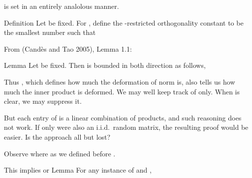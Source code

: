  is set in an entirely analolous manner.

\stopsubsection

\startsubsection [title={Suffice It to Ignore DFT Matrix}]

\Result
{Definition}
{
Let  be fixed.
For , define the -restricted orthogonality constant  to be the smallest number such that
}

From  (Cand\`es and Tao 2005), Lemma 1.1:

\Result
{Lemma}
{
Let  be fixed.
Then  is bounded in both direction as follows,
}

Thus , which defines how much the deformation of norm is, also tells us how much the inner product is deformed.
We may well keep track of  only.
When  is clear, we may suppress it.

But each entry of  is a linear combination of products, and such reasoning does not work.
If only  were also an i.i.d.\ random matrix, the resulting proof would be easier.
Is the approach all but lost?

Observe
where as we defined before .

This implies
or
\Result
{Lemma}
{
For any instance of  and ,
}


